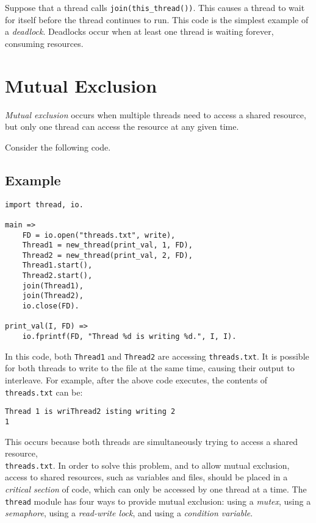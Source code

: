 Suppose that a thread calls \texttt{join(this\_thread())}.  This causes a thread to wait for itself before the thread continues to run.  This code is the simplest example of a \emph{deadlock}.  Deadlocks occur when at least one thread is waiting forever, consuming resources.

\section {Mutual Exclusion}
\emph{Mutual exclusion} occurs when multiple threads need to access a shared resource, but only one thread can access the resource at any given time.

Consider the following code.

\subsection*{Example}
\begin{verbatim}
import thread, io.

main =>
    FD = io.open("threads.txt", write),
    Thread1 = new_thread(print_val, 1, FD),
    Thread2 = new_thread(print_val, 2, FD),
    Thread1.start(),
    Thread2.start(),
    join(Thread1),
    join(Thread2),
    io.close(FD).

print_val(I, FD) =>
    io.fprintf(FD, "Thread %d is writing %d.", I, I).
\end{verbatim}

In this code, both \texttt{Thread1} and \texttt{Thread2} are accessing \texttt{threads.txt}.  It is possible for both threads to write to the file at the same time, causing their output to interleave.  For example, after the above code executes, the contents of \texttt{threads.txt} can be:

\begin{verbatim}
Thread 1 is wriThread2 isting writing 2
1
\end{verbatim}

This occurs because both threads are simultaneously trying to access a shared resource, \\ \texttt{threads.txt}.  In order to solve this problem, and to allow mutual exclusion, access to shared resources, such as variables and files, should be placed in a \emph{critical section} of code, which can only be accessed by one thread at a time.  The \texttt{thread} module has four ways to provide mutual exclusion: using a \emph{mutex}, using a \emph{semaphore}, using a \emph{read-write lock}, and using a \emph{condition variable}.

